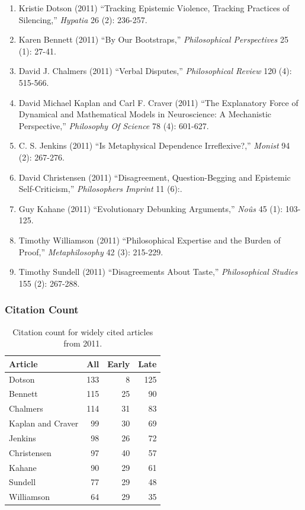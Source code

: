 \documentclass[
  10pt,
  letterpaper,
  DIV=11,
  numbers=noendperiod,
  twoside]{scrartcl}
\providecommand{\tightlist}{%
  \setlength{\itemsep}{0pt}\setlength{\parskip}{0pt}}\usepackage{longtable,booktabs,array}
\begin{document}
\begin{enumerate}
\def\labelenumi{\arabic{enumi}.}
\tightlist
\item
  Kristie Dotson (2011) ``Tracking Epistemic Violence, Tracking
  Practices of Silencing,'' \emph{Hypatia} 26 (2): 236-257.
\item
  Karen Bennett (2011) ``By Our Bootstraps,'' \emph{Philosophical
  Perspectives} 25 (1): 27-41.
\item
  David J. Chalmers (2011) ``Verbal Disputes,'' \emph{Philosophical
  Review} 120 (4): 515-566.
\item
  David Michael Kaplan and Carl F. Craver (2011) ``The Explanatory Force
  of Dynamical and Mathematical Models in Neuroscience: A Mechanistic
  Perspective,'' \emph{Philosophy Of Science} 78 (4): 601-627.
\item
  C. S. Jenkins (2011) ``Is Metaphysical Dependence Irreflexive?,''
  \emph{Monist} 94 (2): 267-276.
\item
  David Christensen (2011) ``Disagreement, Question-Begging and
  Epistemic Self-Criticism,'' \emph{Philosophers Imprint} 11 (6):.
\item
  Guy Kahane (2011) ``Evolutionary Debunking Arguments,'' \emph{Noûs} 45
  (1): 103-125.
\item
  Timothy Williamson (2011) ``Philosophical Expertise and the Burden of
  Proof,'' \emph{Metaphilosophy} 42 (3): 215-229.
\item
  Timothy Sundell (2011) ``Disagreements About Taste,''
  \emph{Philosophical Studies} 155 (2): 267-288.
\end{enumerate}

\subsubsection*{Citation Count}\label{sec-count-2011}

\begin{longtable}[]{@{}lrrr@{}}

\caption{\label{tbl-citation-count-2011}Citation count for widely cited
articles from 2011.}

\tabularnewline

\toprule\noalign{}
Article & All & Early & Late \\
\midrule\noalign{}
\endhead
\bottomrule\noalign{}
\endlastfoot
Dotson & 133 & 8 & 125 \\
Bennett & 115 & 25 & 90 \\
Chalmers & 114 & 31 & 83 \\
Kaplan and Craver & 99 & 30 & 69 \\
Jenkins & 98 & 26 & 72 \\
Christensen & 97 & 40 & 57 \\
Kahane & 90 & 29 & 61 \\
Sundell & 77 & 29 & 48 \\
Williamson & 64 & 29 & 35 \\

\end{longtable}
\end{document}
